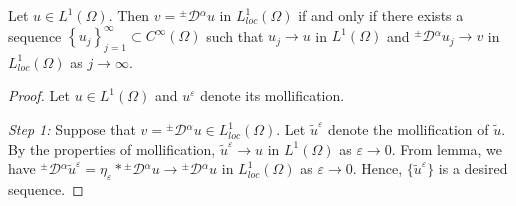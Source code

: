 \documentclass[leqno,final]{siamltex}
\numberwithin{equation}{section}
\newcommand{\eps}{\varepsilon}
\renewcommand{\(}{\bigl(}
\renewcommand{\)}{\bigr)}
\begin{document}
        \begin{theorem}
            Let $u \in L^{1}(\Omega)$. Then $v = {^{\pm}}{\mathcal{D}}{^{\alpha}} u$ in  $L^{1}_{loc} (\Omega)$ if and only if there exists a sequence $\left\{u_j \right\}_{j=1}^{\infty} \subset C^{\infty} (\Omega)$ such that $u_j \rightarrow u$ in $L^{1}(\Omega)$ and ${^{\pm}}{\mathcal{D}}{^{\alpha}} u_j \rightarrow v$ in $L^{1}_{loc}(\Omega)$ as $j \rightarrow \infty$. 
        \end{theorem}

        \begin{proof}
            Let $u \in L^{1}(\Omega)$ and $u^{\eps}$ denote its mollification. 

            {\em Step 1:}  Suppose that $v = {^{\pm}}{\mathcal{D}}{^{\alpha}} u \in L^{1}_{loc}(\Omega)$.  Let $\tilde{u}^{\eps}$ denote the  mollification  of $\tilde{u}$. By the properties of mollification, $\tilde{u}^{\eps} \rightarrow u$ in $L^{1}(\Omega)$ as $\eps\to 0$. From lemma, we have  ${^{\pm}}{\mathcal{D}}{^{\alpha}} \tilde{u}^{\eps} = \eta_{\eps} * {^{\pm}}{\mathcal{D}}{^{\alpha}}u 
             \rightarrow {^{\pm}}{\mathcal{D}}{^{\alpha}} u$ in $L^{1}_{loc}(\Omega)$ as 
            $\eps\to 0$. Hence, $\{\tilde{u}^{\eps} \}$ is a desired sequence. 
            

\end{proof}
\end{document}

